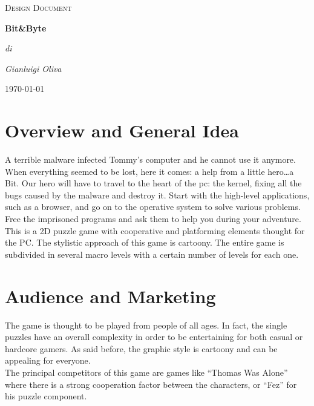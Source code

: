 \documentclass[12pt, a4paper]{report}
\begin{document}
\begin{titlepage}
	\centering
	\vspace{1cm}
	\vspace{1cm}

	{\scshape\Large Design Document\par}
	\vspace{1.5cm}
	{\huge\bfseries Bit\&Byte \par}
	\vspace{1cm}
	\vspace{3cm}
	{\Large\itshape di\par}
	{\Large\itshape Gianluigi Oliva\par}
	\vspace{1.5cm}
	\vfill
	


	\vfill

	{\large \today\par}
\end{titlepage}

\newpage
\tableofcontents
\newpage

\chapter{Overview and General Idea}
A terrible malware infected Tommy’s computer and he cannot use it anymore. When everything seemed to be lost, here it comes: a help from a little hero…a Bit. Our hero will have to travel to the heart of the pc: the kernel, fixing all the bugs caused by the malware and destroy it. Start with the high-level applications, such as a browser, and go on to the operative system to solve various problems. Free the imprisoned programs and ask them to help you during your adventure.\\

This is a 2D puzzle game with cooperative and platforming elements thought for the PC. The stylistic approach of this game is cartoony. The entire game is subdivided in several macro levels with a certain number of levels for each one.

\chapter{Audience and Marketing}
The game is thought to be played from people of all ages. In fact, the single puzzles have an overall complexity in order to be entertaining for both casual or hardcore gamers. As said before, the graphic style is cartoony and can be appealing for everyone.\\
The principal competitors of this game are games like “Thomas Was Alone” where there is a strong cooperation factor between the characters, or “Fez” for his puzzle component.
\end{document}

